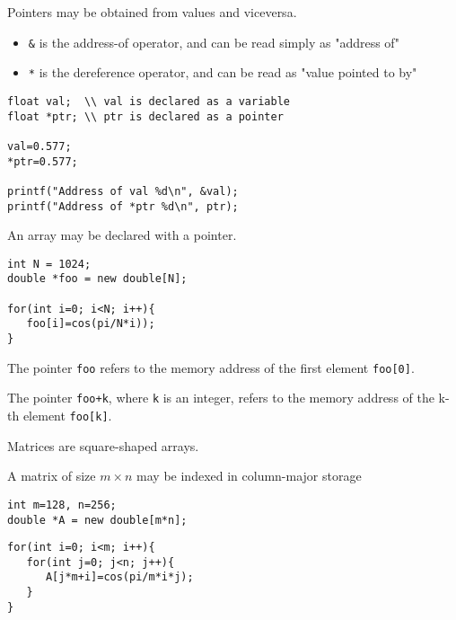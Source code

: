 \documentclass[xcolor={dvipsnames}]{beamer}
\begin{document}
\begin{frame}[fragile]{Pointers may be obtained from values and viceversa.}
\begin{itemize}[<+->]
\item \texttt{\&} is the address-of operator, and can be read simply as "address of"
\item \texttt{*} is the dereference operator, and can be read as "value pointed to by"
\end{itemize}

\pause
\begin{lstlisting}
float val;  \\ val is declared as a variable
float *ptr; \\ ptr is declared as a pointer

val=0.577;
*ptr=0.577;

printf("Address of val %d\n", &val);
printf("Address of *ptr %d\n", ptr);
\end{lstlisting}

\end{frame}

\begin{frame}[fragile]{An array may be declared with a pointer.}{}

\begin{lstlisting}
int N = 1024;
double *foo = new double[N];

for(int i=0; i<N; i++){
   foo[i]=cos(pi/N*i));
}
\end{lstlisting}

\pause
The pointer \texttt{foo} refers to the memory address of the first element \texttt{foo[0]}.

\pause
\bigskip
The pointer \texttt{foo+k}, where \texttt{k} is an integer, refers to the memory address of the k-th element \texttt{foo[k]}.
\end{frame}

\begin{frame}[fragile]{Matrices are square-shaped arrays.}{}



A matrix of size $m\times n$ may be indexed in column-major storage
\begin{lstlisting}
int m=128, n=256;
double *A = new double[m*n];
\end{lstlisting}
\pause
\begin{lstlisting}
for(int i=0; i<m; i++){
   for(int j=0; j<n; j++){
      A[j*m+i]=cos(pi/m*i*j);
   }
}
\end{lstlisting}
\end{frame}
\end{document}
